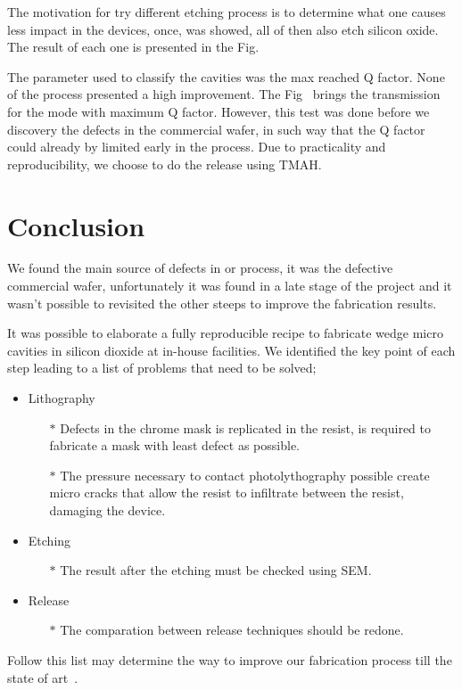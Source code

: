 The motivation for try different etching process is to determine what one causes less impact in the devices, once, was showed, all of then also etch silicon oxide. The result of each one is presented in the Fig. 

The parameter used to classify the cavities was the max reached Q factor. None of the process presented a high improvement. The Fig~ brings the transmission for the mode with maximum Q factor. However, this test was done before we discovery the defects in the commercial wafer, in such way that the Q factor could already by limited early in the process. Due to practicality and reproducibility, we choose to do the release using TMAH.   
 
\section{Conclusion}

We found the main source of defects in or process, it was the defective commercial wafer, unfortunately it was found in a late stage of the project and it wasn't possible to revisited the other steeps to improve the fabrication results. 

It was possible to elaborate a fully reproducible recipe to fabricate wedge micro cavities in silicon dioxide at in-house facilities. We identified the key point of each step leading to a list of problems that need to be solved;
\begin{itemize}
    \item Lithography
    \begin{itemize}
        \item[$\ast$] Defects in the chrome mask is replicated in the resist, is required to fabricate a mask with least defect as possible. 
        \item[$\ast$] The pressure necessary to contact photolythography possible create micro cracks that allow the resist to infiltrate between the resist, damaging the device.
    \end{itemize}
 
    \item Etching
    \begin{itemize}    
        \item[$\ast$] The result after the etching must be checked using SEM.
    \end{itemize}
    
    \item Release
    \begin{itemize}
        \item[$\ast$] The comparation between release techniques should be redone.
    \end{itemize}
\end{itemize}

Follow this list may determine the way to improve our fabrication process till the state of art~\needcit. 




